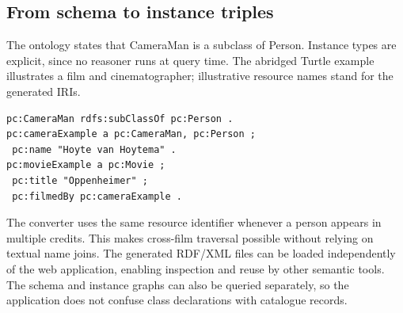 \documentclass[sigconf,nonacm]{acmart}
\begin{document}
\subsection{From schema to instance triples}
The ontology states that CameraMan is a subclass of Person. Instance types are explicit, since no reasoner runs at query time. The abridged Turtle example illustrates a film and cinematographer; illustrative resource names stand for the generated IRIs.
\begin{lstlisting}
pc:CameraMan rdfs:subClassOf pc:Person .
pc:cameraExample a pc:CameraMan, pc:Person ;
 pc:name "Hoyte van Hoytema" .
pc:movieExample a pc:Movie ;
 pc:title "Oppenheimer" ;
 pc:filmedBy pc:cameraExample .
\end{lstlisting}
The converter uses the same resource identifier whenever a person appears in multiple credits. This makes cross-film traversal possible without relying on textual name joins. The generated RDF/XML files can be loaded independently of the web application, enabling inspection and reuse by other semantic tools. The schema and instance graphs can also be queried separately, so the application does not confuse class declarations with catalogue records.
\newpage
\end{document}
